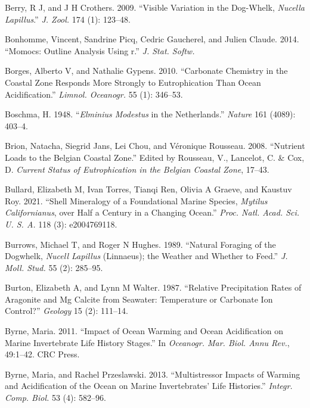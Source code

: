 \documentclass[smallextended]{svjour3}       %
\newlength{\cslhangindent}
\newenvironment{CSLReferences}[2] %
 {%
  \setlength{\parindent}{0pt}
  \ifodd #1 \everypar{\setlength{\hangindent}{\cslhangindent}}\ignorespaces\fi
  \ifnum #2 > 0
  \setlength{\parskip}{#2\baselineskip}
  \fi
 }%
 {}
\begin{document}
\begin{CSLReferences}{1}{0}
\leavevmode{}%
Berry, R J, and J H Crothers. 2009. {``Visible Variation in the
Dog-Whelk, \emph{Nucella Lapillus}.''} \emph{J. Zool.} 174 (1): 123--48.

\leavevmode{}%
Bonhomme, Vincent, Sandrine Picq, Cedric Gaucherel, and Julien Claude.
2014. {``Momocs: Outline Analysis Using r.''} \emph{J. Stat. Softw.}

\leavevmode{}%
Borges, Alberto V, and Nathalie Gypens. 2010. {``Carbonate Chemistry in
the Coastal Zone Responds More Strongly to Eutrophication Than Ocean
Acidification.''} \emph{Limnol. Oceanogr.} 55 (1): 346--53.

\leavevmode{}%
Boschma, H. 1948. {``\emph{Elminius Modestus} in the Netherlands.''}
\emph{Nature} 161 (4089): 403--4.

\leavevmode{}%
Brion, Natacha, Siegrid Jans, Lei Chou, and Véronique Rousseau. 2008.
{``Nutrient Loads to the Belgian Coastal Zone.''} Edited by Rousseau,
V., Lancelot, C. \& Cox, D. \emph{Current Status of Eutrophication in
the Belgian Coastal Zone}, 17--43.

\leavevmode{}%
Bullard, Elizabeth M, Ivan Torres, Tianqi Ren, Olivia A Graeve, and
Kaustuv Roy. 2021. {``Shell Mineralogy of a Foundational Marine Species,
\emph{Mytilus Californianus}, over Half a Century in a Changing
Ocean.''} \emph{Proc. Natl. Acad. Sci. U. S. A.} 118 (3): e2004769118.

\leavevmode{}%
Burrows, Michael T, and Roger N Hughes. 1989. {``Natural Foraging of the
Dogwhelk, \emph{Nucell Lapillus} (Linnaeus); the Weather and Whether to
Feed.''} \emph{J. Moll. Stud.} 55 (2): 285--95.

\leavevmode{}%
Burton, Elizabeth A, and Lynn M Walter. 1987. {``Relative Precipitation
Rates of Aragonite and Mg Calcite from Seawater: Temperature or
Carbonate Ion Control?''} \emph{Geology} 15 (2): 111--14.

\leavevmode{}%
Byrne, Maria. 2011. {``Impact of Ocean Warming and Ocean Acidification
on Marine Invertebrate Life History Stages.''} In \emph{Oceanogr. Mar.
Biol. Annu Rev.}, 49:1--42. CRC Press.

\leavevmode{}%
Byrne, Maria, and Rachel Przeslawski. 2013. {``Multistressor Impacts of
Warming and Acidification of the Ocean on Marine Invertebrates' Life
Histories.''} \emph{Integr. Comp. Biol.} 53 (4): 582--96.


\end{CSLReferences}
\end{document}
